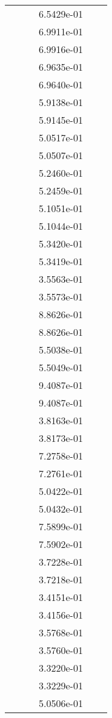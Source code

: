 \begin{xltabular}{\textwidth}{r|rS[table-format=1.3e+2]S[table-format=1.4e+2]S[table-format=1.4e+2]S[table-format=-1.5]}
&  &  & 6.5429e-01 & & \\
&  &  & 6.9911e-01 & & \\
&  &  & 6.9916e-01 & & \\
&  &  & 6.9635e-01 & & \\
&  &  & 6.9640e-01 & & \\
&  &  & 5.9138e-01 & & \\
&  &  & 5.9145e-01 & & \\
&  &  & 5.0517e-01 & & \\
&  &  & 5.0507e-01 & & \\
&  &  & 5.2460e-01 & & \\
&  &  & 5.2459e-01 & & \\
&  &  & 5.1051e-01 & & \\
&  &  & 5.1044e-01 & & \\
&  &  & 5.3420e-01 & & \\
&  &  & 5.3419e-01 & & \\
&  &  & 3.5563e-01 & & \\
&  &  & 3.5573e-01 & & \\
&  &  & 8.8626e-01 & & \\
&  &  & 8.8626e-01 & & \\
&  &  & 5.5038e-01 & & \\
&  &  & 5.5049e-01 & & \\
&  &  & 9.4087e-01 & & \\
&  &  & 9.4087e-01 & & \\
&  &  & 3.8163e-01 & & \\
&  &  & 3.8173e-01 & & \\
&  &  & 7.2758e-01 & & \\
&  &  & 7.2761e-01 & & \\
&  &  & 5.0422e-01 & & \\
&  &  & 5.0432e-01 & & \\
&  &  & 7.5899e-01 & & \\
&  &  & 7.5902e-01 & & \\
&  &  & 3.7228e-01 & & \\
&  &  & 3.7218e-01 & & \\
&  &  & 3.4151e-01 & & \\
&  &  & 3.4156e-01 & & \\
&  &  & 3.5768e-01 & & \\
&  &  & 3.5760e-01 & & \\
&  &  & 3.3220e-01 & & \\
&  &  & 3.3229e-01 & & \\
&  &  & 5.0506e-01 & & \\

\end{xltabular}
